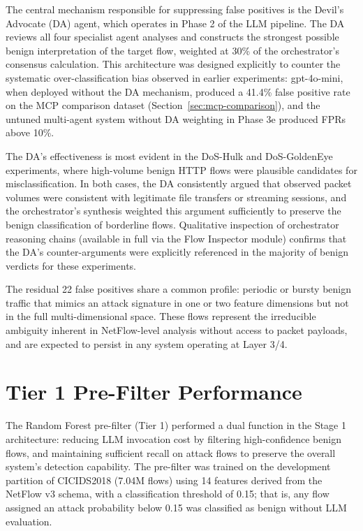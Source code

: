The central mechanism responsible for suppressing false positives is the Devil's Advocate (DA) agent, which operates in Phase 2 of the LLM pipeline. The DA reviews all four specialist agent analyses and constructs the strongest possible benign interpretation of the target flow, weighted at 30\% of the orchestrator's consensus calculation. This architecture was designed explicitly to counter the systematic over-classification bias observed in earlier experiments: gpt-4o-mini, when deployed without the DA mechanism, produced a 41.4\% false positive rate on the MCP comparison dataset (Section~\ref{sec:mcp-comparison}), and the untuned multi-agent system without DA weighting in Phase 3e produced FPRs above 10\%.

The DA's effectiveness is most evident in the DoS-Hulk and DoS-GoldenEye experiments, where high-volume benign HTTP flows were plausible candidates for misclassification. In both cases, the DA consistently argued that observed packet volumes were consistent with legitimate file transfers or streaming sessions, and the orchestrator's synthesis weighted this argument sufficiently to preserve the benign classification of borderline flows. Qualitative inspection of orchestrator reasoning chains (available in full via the Flow Inspector module) confirms that the DA's counter-arguments were explicitly referenced in the majority of benign verdicts for these experiments.

The residual 22 false positives share a common profile: periodic or bursty benign traffic that mimics an attack signature in one or two feature dimensions but not in the full multi-dimensional space. These flows represent the irreducible ambiguity inherent in NetFlow-level analysis without access to packet payloads, and are expected to persist in any system operating at Layer 3/4.

\section{Tier 1 Pre-Filter Performance}
\label{sec:tier1-performance}

The Random Forest pre-filter (Tier 1) performed a dual function in the Stage 1 architecture: reducing LLM invocation cost by filtering high-confidence benign flows, and maintaining sufficient recall on attack flows to preserve the overall system's detection capability. The pre-filter was trained on the development partition of CICIDS2018 (7.04M flows) using 14 features derived from the NetFlow v3 schema, with a classification threshold of 0.15; that is, any flow assigned an attack probability below 0.15 was classified as benign without LLM evaluation.

